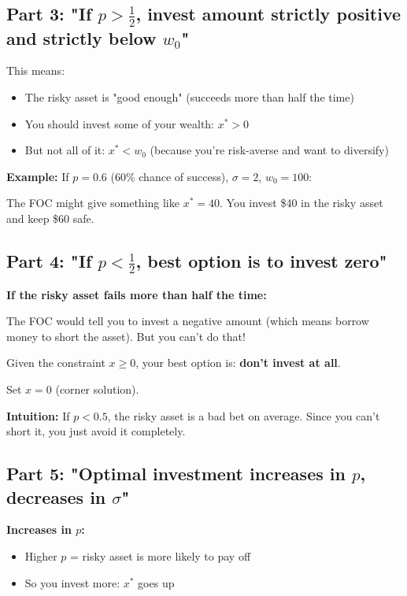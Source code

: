 \documentclass[12pt]{article}
\begin{document}
\subsection*{Part 3: "If $p > \frac{1}{2}$, invest amount strictly positive and strictly below $w_0$"}

This means:
\begin{itemize}
\item The risky asset is "good enough" (succeeds more than half the time)
\item You should invest some of your wealth: $x^* > 0$
\item But not all of it: $x^* < w_0$ (because you're risk-averse and want to diversify)
\end{itemize}

\textbf{Example:} If $p = 0.6$ (60\% chance of success), $\sigma = 2$, $w_0 = 100$:

The FOC might give something like $x^* = 40$. You invest \$40 in the risky asset and keep \$60 safe.

\newpage

\subsection*{Part 4: "If $p < \frac{1}{2}$, best option is to invest zero"}

\begin{tcolorbox}[colback=red!5!white,colframe=red!75!black]
\textbf{If the risky asset fails more than half the time:}

The FOC would tell you to invest a negative amount (which means borrow money to short the asset). But you can't do that!

Given the constraint $x \geq 0$, your best option is: \textbf{don't invest at all}.

Set $x = 0$ (corner solution).
\end{tcolorbox}

\textbf{Intuition:} If $p < 0.5$, the risky asset is a bad bet on average. Since you can't short it, you just avoid it completely.

\subsection*{Part 5: "Optimal investment increases in $p$, decreases in $\sigma$"}

\textbf{Increases in $p$:}
\begin{itemize}
\item Higher $p$ = risky asset is more likely to pay off
\item So you invest more: $x^*$ goes up
\end{itemize}
\end{document}
